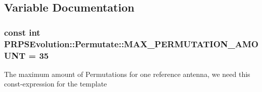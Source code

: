 \subsection{\-Variable \-Documentation}
\hypertarget{namespace_p_r_p_s_evolution_1_1_permutate_a11c56bc21699001cd4ee0afd5d07c7d9}{
\subsubsection[{\-M\-A\-X\-\_\-\-P\-E\-R\-M\-U\-T\-A\-T\-I\-O\-N\-\_\-\-A\-M\-O\-U\-N\-T}]{\setlength{\rightskip}{0pt plus 5cm}const int {\bf \-P\-R\-P\-S\-Evolution\-::\-Permutate\-::\-M\-A\-X\-\_\-\-P\-E\-R\-M\-U\-T\-A\-T\-I\-O\-N\-\_\-\-A\-M\-O\-U\-N\-T} = 35}}\label{namespace_p_r_p_s_evolution_1_1_permutate_a11c56bc21699001cd4ee0afd5d07c7d9}
\-The maximum amount of \-Permutations for one reference antenna, we need this const-\/expression for the template 